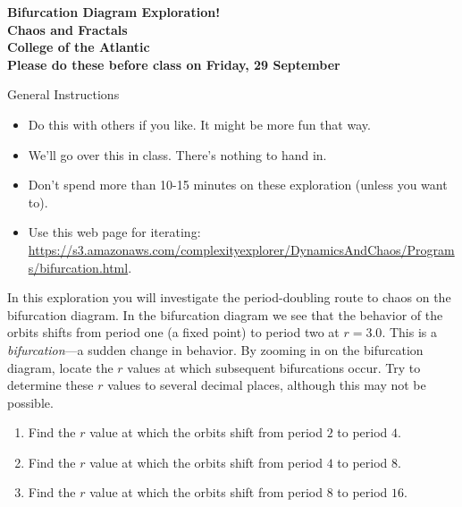 \documentclass[12pt]{article}
\begin{document}
\pagestyle{empty}
 
\begin{center}
{\LARGE {\bf Bifurcation Diagram Exploration!}}\\
\bigskip
{\Large {\bf Chaos and Fractals}}\\
\bigskip
{\Large {\bf College of the Atlantic}}\\
\bigskip
    {{\bf Please do these before class on Friday, 29 September}}\\
\end{center}
\medskip

\noindent General Instructions

\begin{itemize}
\setlength{\itemsep}{0mm}
\item Do this with others if you like. It might be more fun that
  way.
\item We'll go over this in class. There's nothing to hand in. 
\item Don't spend more than 10-15 minutes on these exploration (unless
  you want to).
  \item Use this web page for iterating:
    \href{https://s3.amazonaws.com/complexityexplorer/DynamicsAndChaos/Programs/bifurcation.html}{\url{https://s3.amazonaws.com/complexityexplorer/DynamicsAndChaos/Programs/bifurcation.html}}.    
\end{itemize}


\noindent In this exploration you will investigate the period-doubling
route to chaos on the bifurcation diagram.  In the bifurcation diagram
we see that the behavior of the orbits shifts from period one (a fixed
point) to period two at $r=3.0$. This is a \emph{bifurcation}---a
sudden change in behavior.
By zooming in on the bifurcation diagram, locate
the $r$ values at which subsequent bifurcations occur. Try to determine
these $r$ values to several decimal places, although this may not be
possible.  

\begin{enumerate}

  \item Find the $r$ value at which the orbits shift from period $2$
    to period $4$.
  \item Find the $r$ value at which the orbits shift from period $4$
    to period $8$.
  \item Find the $r$ value at which the orbits shift from period $8$
    to period $16$.  
\end{enumerate}
\end{document}
